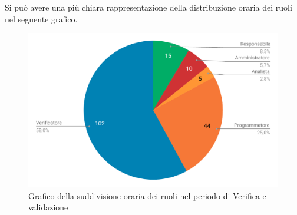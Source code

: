 Si può avere una più chiara rappresentazione della distribuzione oraria dei ruoli nel seguente grafico.

\begin{figure}[H]
	\includegraphics[width=1\linewidth]{Preventivo/grafici/VV2.pdf}
	\caption{Grafico della suddivisione oraria dei ruoli nel periodo di Verifica e validazione}
\end{figure}

